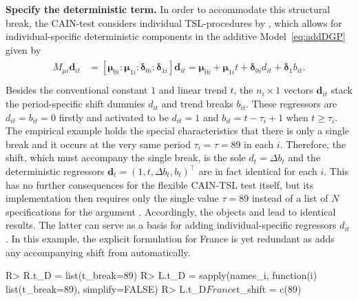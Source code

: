 \textbf{Specify the deterministic term.} In order to accommodate this structural break, the CAIN-test considers individual TSL-procedures by \citet{TrenklerEtAl2008}, which allows for individual-specific deterministic components in the additive Model~\eqref{eq:addDGP} given by
\begin{align} \label{eq:detTerm}
\begin{split}
	M_{\mu i} \boldsymbol{d}_{it} & = \left[ \boldsymbol{\mu}_{0i} : \boldsymbol{\mu}_{1i} : \boldsymbol{\delta}_{0i} : \boldsymbol{\delta}_{1i} \right] \boldsymbol{d}_{it}	= \boldsymbol{\mu}_{0i} + \boldsymbol{\mu}_{1i}t + \boldsymbol{\delta}_{0i} d_{it} + \boldsymbol{\delta}_1 b_{it}. \\
\end{split}
\end{align}
Besides the conventional constant $ 1 $ and linear trend $ t $, the $ n_i \times 1 $ vectors $ \boldsymbol{d}_{it} $ stack the period-specific shift dummies $ d_{it} $ and trend breaks $ b_{it} $. These regressors are $ d_{it} = b_{it} = 0 $ firstly and activated to be  $ d_{it} = 1 $ and  $ b_{it} = t -\tau_i +1 $ when $ t \geq \tau_i $. The empirical example holds the special characteristics that there is only a single break and it occurs at the very same period $ \tau_i = \tau = 89 $ in each $ i $. Therefore, the shift, which must accompany the single break, is the sole $ d_{t} = \Delta b_t $ and the deterministic regressors $ \boldsymbol{d}_{t} = \left( 1, t, \Delta b_t, b_t \right)^\top $ are in fact identical for each $ i $. This has no further consequences for the flexible CAIN-TSL test itself, but its implementation  then requires only the single value $ \tau=89 $ instead of a list of $ N $ specifications for the argument . Accordingly, the objects  and  lead to identical results. The latter can serve as a basis for adding individual-specific regressors $ d_{it} $. In this example, the explicit formulation for France is yet redundant as  adds any accompanying shift from  automatically.
\begin{CodeChunk}
\begin{CodeInput}
R> R.t_D = list(t_break=89)
R> L.t_D = sapply(names_i, function(i) list(t_break=89), simplify=FALSE)
R> L.t_D$France$t_shift = c(89)
\end{CodeInput}
\end{CodeChunk}

